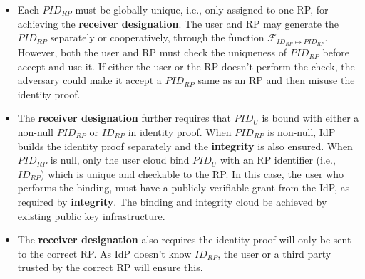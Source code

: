 \begin{itemize}
  \item %
  Each $PID_{RP}$ must be globally unique, i.e., only assigned to one RP,  for achieving the \textbf{receiver designation}.
        The user and RP may generate the $PID_{RP}$ separately or cooperatively, through the function $\mathcal{F}_{ID_{RP} \mapsto PID_{RP}}$.
        However, both the user and RP must check the uniqueness of $PID_{RP}$ before accept and use it.
        If either the user or the RP doesn't perform the check, the adversary could make it accept a $PID_{RP}$ same as an RP and then misuse the identity proof.
  \item The \textbf{receiver designation} further requires that  $PID_{U}$ is bound with either a non-null $PID_{RP}$ or $ID_{RP}$ in identity proof.
        When $PID_{RP}$  is non-null, IdP builds the identity proof separately and the \textbf{integrity} is also ensured.
        When $PID_{RP}$  is null, only the user cloud bind $PID_{U}$ with an RP identifier (i.e., $ID_{RP}$) which is unique and checkable to the RP.
        In this case, the user who performs the binding, must have a publicly verifiable grant from the IdP, as required by \textbf{integrity}.
        The binding and integrity cloud be achieved by existing public key infrastructure.
   \item The \textbf{receiver designation} also requires the identity proof will only be sent to the correct RP.
       As IdP doesn't know $ID_{RP}$, the user or a third party trusted by the correct RP will ensure this.
\end{itemize}


